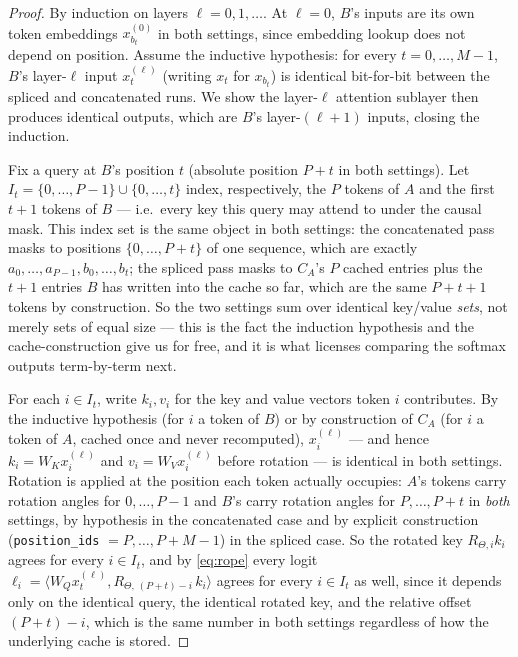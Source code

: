 \documentclass[11pt]{article}
\begin{document}
\begin{proof}
By induction on layers $\ell = 0, 1, \dots$. At $\ell = 0$, $B$'s inputs are its
own token embeddings $x_{b_t}^{(0)}$ in both settings, since embedding lookup
does not depend on position. Assume the inductive hypothesis: for every
$t = 0,\dots,M-1$, $B$'s layer-$\ell$ input $x_t^{(\ell)}$ (writing $x_t$ for
$x_{b_t}$) is identical bit-for-bit between the spliced and concatenated runs.
We show the layer-$\ell$ attention sublayer then produces identical outputs,
which are $B$'s layer-$(\ell{+}1)$ inputs, closing the induction.

Fix a query at $B$'s position $t$ (absolute position $P+t$ in both settings).
Let $I_t = \{0,\dots,P-1\} \cup \{0,\dots,t\}$ index, respectively, the $P$
tokens of $A$ and the first $t{+}1$ tokens of $B$ --- i.e.\ every key this
query may attend to under the causal mask. This index set is the same object
in both settings: the concatenated pass masks to positions $\{0,\dots,P+t\}$ of
one sequence, which are exactly $a_0,\dots,a_{P-1},b_0,\dots,b_t$; the spliced
pass masks to $C_A$'s $P$ cached entries plus the $t{+}1$ entries $B$ has
written into the cache so far, which are the same $P{+}t{+}1$ tokens by
construction. So the two settings sum over identical key/value \emph{sets}, not
merely sets of equal size --- this is the fact the induction hypothesis and the
cache-construction give us for free, and it is what licenses comparing the
softmax outputs term-by-term next.

For each $i \in I_t$, write $k_i, v_i$ for the key and value vectors token $i$
contributes. By the inductive hypothesis (for $i$ a token of $B$) or by
construction of $C_A$ (for $i$ a token of $A$, cached once and never
recomputed), $x_i^{(\ell)}$ --- and hence $k_i = W_K x_i^{(\ell)}$ and
$v_i = W_V x_i^{(\ell)}$ before rotation --- is identical in both settings.
Rotation is applied at the position each token actually occupies: $A$'s tokens
carry rotation angles for $0,\dots,P-1$ and $B$'s carry rotation angles for
$P,\dots,P+t$ in \emph{both} settings, by hypothesis in the concatenated case
and by explicit construction (\texttt{position\_ids} $= P,\dots,P+M-1$) in the
spliced case. So the rotated key $R_{\Theta,i}k_i$ agrees for every
$i \in I_t$, and by \eqref{eq:rope} every logit
$\ell_i = \langle W_Q x_t^{(\ell)}, R_{\Theta,\,(P+t)-i}\,k_i\rangle$ agrees for
every $i \in I_t$ as well, since it depends only on the identical query, the
identical rotated key, and the relative offset $(P+t)-i$, which is the same
number in both settings regardless of how the underlying cache is stored.


\end{proof}
\end{document}
